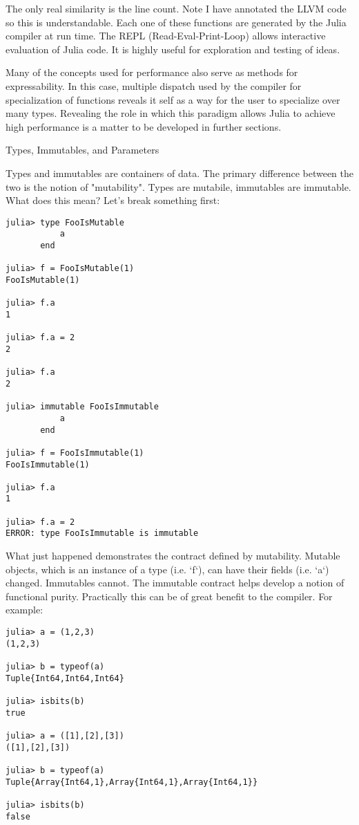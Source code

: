 \documentclass[a4paper]{article}
\begin{document}
The only real similarity is the line count. Note I have annotated the LLVM code
so this is understandable. Each one of these functions are generated by the
Julia compiler at run time. The REPL (Read-Eval-Print-Loop) allows interactive
evaluation of Julia code. It is highly useful for exploration and testing of
ideas.

Many of the concepts used for performance also serve as methods for
expressability. In this case, multiple dispatch used by the compiler for
specialization of functions reveals it self as a way for the user to
specialize over many types.
Revealing the role in which this paradigm allows Julia to achieve high
performance is a matter to be developed in further sections.

 Types, Immutables, and Parameters

Types and immutables are containers of data. The primary difference between
the two is the notion of "mutability". Types are mutabile, immutables are 
immutable. What does this mean? Let's break something first:
\begin{lstlisting}
julia> type FooIsMutable
           a
       end

julia> f = FooIsMutable(1)
FooIsMutable(1)

julia> f.a
1

julia> f.a = 2
2

julia> f.a
2

julia> immutable FooIsImmutable
           a
       end

julia> f = FooIsImmutable(1)
FooIsImmutable(1)

julia> f.a
1

julia> f.a = 2
ERROR: type FooIsImmutable is immutable
\end{lstlisting}

What just happened demonstrates the contract defined by mutability. Mutable
objects, which is an instance of a type (i.e. `f`), can have their fields
(i.e. `a`) changed. Immutables cannot. The immutable contract helps develop
a notion of functional purity. Practically this can be of great benefit to
the compiler. For example:
\begin{lstlisting}
julia> a = (1,2,3)
(1,2,3)

julia> b = typeof(a)
Tuple{Int64,Int64,Int64}

julia> isbits(b)
true

julia> a = ([1],[2],[3])
([1],[2],[3])

julia> b = typeof(a)
Tuple{Array{Int64,1},Array{Int64,1},Array{Int64,1}}

julia> isbits(b)
false
\end{lstlisting}
\end{document}
